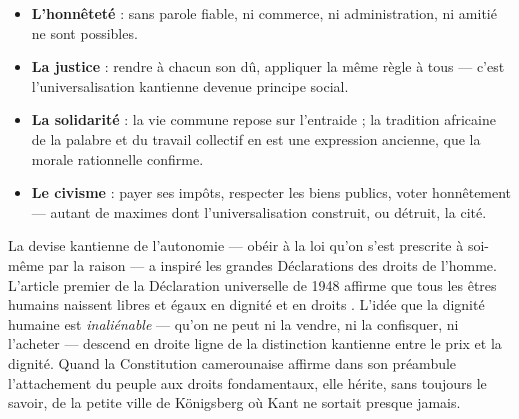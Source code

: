 \documentclass[11pt]{article}
\newcommand{\cle}[1]{{\popxbold\color{popdark}#1}}
\begin{document}
\begin{itemize}
\item \textbf{L'honnêteté} : sans parole fiable, ni commerce, ni administration, ni amitié ne sont possibles.
\item \textbf{La justice} : rendre à chacun son dû, appliquer la même règle à tous — c'est l'universalisation kantienne devenue principe social.
\item \textbf{La solidarité} : la vie commune repose sur l'entraide ; la tradition africaine de la palabre et du travail collectif en est une expression ancienne, que la morale rationnelle confirme.
\item \textbf{Le civisme} : payer ses impôts, respecter les biens publics, voter honnêtement — autant de maximes dont l'universalisation construit, ou détruit, la cité.
\end{itemize}

\begin{savaistu}
La devise kantienne de l'\cle{autonomie} — obéir à la loi qu'on s'est prescrite à soi-même par la raison — a inspiré les grandes Déclarations des droits de l'homme. L'article premier de la Déclaration universelle de 1948 affirme que tous les êtres humains naissent \guillemotleft libres et égaux en dignité et en droits \guillemotright. L'idée que la dignité humaine est \emph{inaliénable} — qu'on ne peut ni la vendre, ni la confisquer, ni l'acheter — descend en droite ligne de la distinction kantienne entre le prix et la dignité. Quand la Constitution camerounaise affirme dans son préambule l'attachement du peuple aux droits fondamentaux, elle hérite, sans toujours le savoir, de la petite ville de Königsberg où Kant ne sortait presque jamais.
\end{savaistu}
\end{document}
